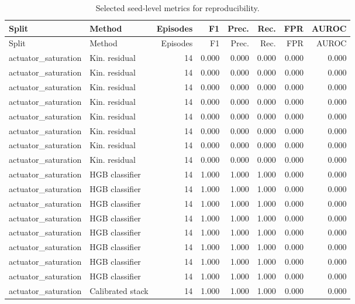 {\scriptsize
\setlength{\tabcolsep}{2.5pt}
\begin{longtable}{llrrrrrr}
\caption{Selected seed-level metrics for reproducibility.}\label{tab:seed-metrics}\\
\toprule
Split & Method & Episodes & F1 & Prec. & Rec. & FPR & AUROC \\
\midrule
\endfirsthead
\toprule
Split & Method & Episodes & F1 & Prec. & Rec. & FPR & AUROC \\
\midrule
\endhead
actuator\_saturation & Kin. residual & 14 & 0.000 & 0.000 & 0.000 & 0.000 & 0.000 \\
actuator\_saturation & Kin. residual & 14 & 0.000 & 0.000 & 0.000 & 0.000 & 0.000 \\
actuator\_saturation & Kin. residual & 14 & 0.000 & 0.000 & 0.000 & 0.000 & 0.000 \\
actuator\_saturation & Kin. residual & 14 & 0.000 & 0.000 & 0.000 & 0.000 & 0.000 \\
actuator\_saturation & Kin. residual & 14 & 0.000 & 0.000 & 0.000 & 0.000 & 0.000 \\
actuator\_saturation & Kin. residual & 14 & 0.000 & 0.000 & 0.000 & 0.000 & 0.000 \\
actuator\_saturation & Kin. residual & 14 & 0.000 & 0.000 & 0.000 & 0.000 & 0.000 \\
actuator\_saturation & Kin. residual & 14 & 0.000 & 0.000 & 0.000 & 0.000 & 0.000 \\
actuator\_saturation & HGB classifier & 14 & 1.000 & 1.000 & 1.000 & 0.000 & 0.000 \\
actuator\_saturation & HGB classifier & 14 & 1.000 & 1.000 & 1.000 & 0.000 & 0.000 \\
actuator\_saturation & HGB classifier & 14 & 1.000 & 1.000 & 1.000 & 0.000 & 0.000 \\
actuator\_saturation & HGB classifier & 14 & 1.000 & 1.000 & 1.000 & 0.000 & 0.000 \\
actuator\_saturation & HGB classifier & 14 & 1.000 & 1.000 & 1.000 & 0.000 & 0.000 \\
actuator\_saturation & HGB classifier & 14 & 1.000 & 1.000 & 1.000 & 0.000 & 0.000 \\
actuator\_saturation & HGB classifier & 14 & 1.000 & 1.000 & 1.000 & 0.000 & 0.000 \\
actuator\_saturation & HGB classifier & 14 & 1.000 & 1.000 & 1.000 & 0.000 & 0.000 \\
actuator\_saturation & Calibrated stack & 14 & 1.000 & 1.000 & 1.000 & 0.000 & 0.000 \\

\end{longtable}}
